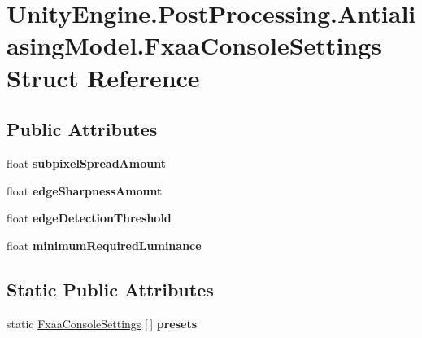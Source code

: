 \hypertarget{struct_unity_engine_1_1_post_processing_1_1_antialiasing_model_1_1_fxaa_console_settings}{}\section{Unity\+Engine.\+Post\+Processing.\+Antialiasing\+Model.\+Fxaa\+Console\+Settings Struct Reference}
\label{struct_unity_engine_1_1_post_processing_1_1_antialiasing_model_1_1_fxaa_console_settings}
\subsection*{Public Attributes}
\begin{DoxyCompactItemize}
\item 
\mbox{\label{struct_unity_engine_1_1_post_processing_1_1_antialiasing_model_1_1_fxaa_console_settings_a62f92a7785b3852cd58a0b30388b5694}} 
float {\bfseries subpixel\+Spread\+Amount}
\item 
\mbox{\label{struct_unity_engine_1_1_post_processing_1_1_antialiasing_model_1_1_fxaa_console_settings_a936bf87fcddf7c1a744c14e58c8e3fec}} 
float {\bfseries edge\+Sharpness\+Amount}
\item 
\mbox{\label{struct_unity_engine_1_1_post_processing_1_1_antialiasing_model_1_1_fxaa_console_settings_aa2c6e96f122692f59b48a1259aab595d}} 
float {\bfseries edge\+Detection\+Threshold}
\item 
\mbox{\label{struct_unity_engine_1_1_post_processing_1_1_antialiasing_model_1_1_fxaa_console_settings_a1ab7378c63a8f03d5bca7e93ed6dcdf6}} 
float {\bfseries minimum\+Required\+Luminance}
\end{DoxyCompactItemize}
\subsection*{Static Public Attributes}
\begin{DoxyCompactItemize}
\item 
\mbox{\label{struct_unity_engine_1_1_post_processing_1_1_antialiasing_model_1_1_fxaa_console_settings_a9b6cc245d52f7e835e731723bb678e01}} 
static \hyperlink{struct_unity_engine_1_1_post_processing_1_1_antialiasing_model_1_1_fxaa_console_settings}{Fxaa\+Console\+Settings} \mbox{[}$\,$\mbox{]} {\bfseries presets}
\end{DoxyCompactItemize}


